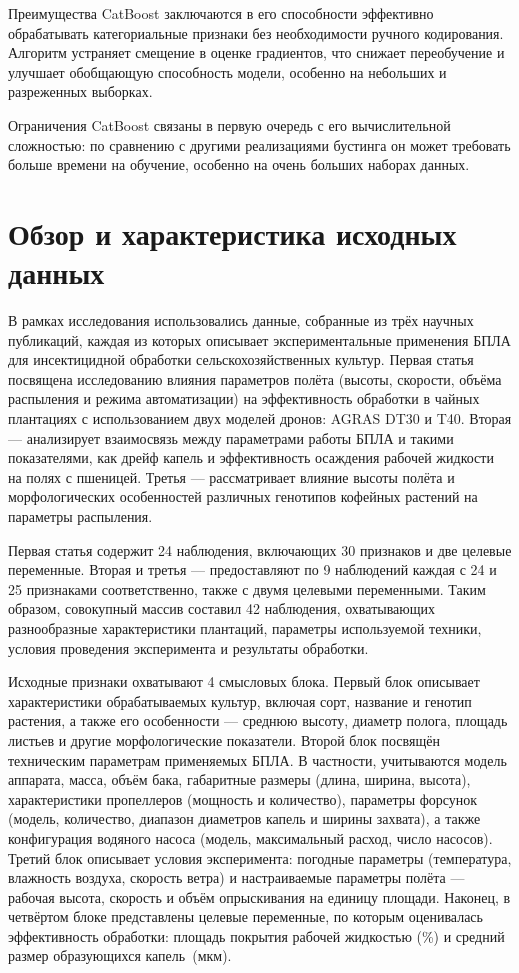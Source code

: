 Преимущества CatBoost заключаются в его способности эффективно обрабатывать категориальные признаки без необходимости ручного кодирования. Алгоритм устраняет смещение в оценке градиентов, что снижает переобучение и улучшает обобщающую способность модели, особенно на небольших и разреженных выборках.

Ограничения CatBoost связаны в первую очередь с его вычислительной сложностью: по сравнению с другими реализациями бустинга он может требовать больше времени на обучение, особенно на очень больших наборах данных.

\section{Обзор и характеристика исходных данных}\label{ch1:data}

В рамках исследования использовались данные, собранные из трёх научных публикаций, каждая из которых описывает экспериментальные применения БПЛА для инсектицидной обработки сельскохозяйственных культур. Первая статья \cite{Wu2025} посвящена исследованию влияния параметров полёта (высоты, скорости, объёма распыления и режима автоматизации) на эффективность обработки в чайных плантациях с использованием двух моделей дронов: AGRAS DT30 и T40. Вторая \cite{Liu2025} --- анализирует взаимосвязь между параметрами работы БПЛА и такими показателями, как дрейф капель и эффективность осаждения рабочей жидкости на полях с пшеницей. Третья \cite{Vitoria2022} --- рассматривает влияние высоты полёта и морфологических особенностей различных генотипов кофейных растений на параметры распыления.

Первая статья содержит 24 наблюдения, включающих 30 признаков и две целевые переменные. Вторая и третья --- предоставляют по 9 наблюдений каждая с 24 и 25 признаками соответственно, также с двумя целевыми переменными. Таким образом, совокупный массив составил 42 наблюдения, охватывающих разнообразные характеристики плантаций, параметры используемой техники, условия проведения эксперимента и результаты обработки.

Исходные признаки охватывают 4 смысловых блока. Первый блок описывает характеристики обрабатываемых культур, включая сорт, название и генотип растения, а также его особенности --- среднюю высоту, диаметр полога, площадь листьев и другие морфологические показатели. Второй блок посвящён техническим параметрам применяемых БПЛА. В частности, учитываются модель аппарата, масса, объём бака, габаритные размеры (длина, ширина, высота), характеристики пропеллеров (мощность и количество), параметры форсунок (модель, количество, диапазон диаметров капель и ширины захвата), а также конфигурация водяного насоса (модель, максимальный расход, число насосов). Третий блок описывает условия эксперимента: погодные параметры (температура, влажность воздуха, скорость ветра) и настраиваемые параметры полёта --- рабочая высота, скорость и объём опрыскивания на единицу площади. Наконец, в четвёртом блоке представлены целевые переменные, по которым оценивалась эффективность обработки: площадь покрытия рабочей жидкостью (\%) и средний размер образующихся \mbox{капель (мкм)}.

